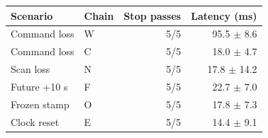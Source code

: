 \begin{tabular}{@{}llrr@{}}
\toprule
Scenario & Chain & Stop passes & Latency (ms) \\
\midrule
Command loss & W & 5/5 & 95.5 $\pm$ 8.6 \\
Command loss & C & 5/5 & 18.0 $\pm$ 4.7 \\
Scan loss & N & 5/5 & 17.8 $\pm$ 14.2 \\
Future +10 s & F & 5/5 & 22.7 $\pm$ 7.0 \\
Frozen stamp & O & 5/5 & 17.8 $\pm$ 7.3 \\
Clock reset & E & 5/5 & 14.4 $\pm$ 9.1 \\
\bottomrule
\end{tabular}
